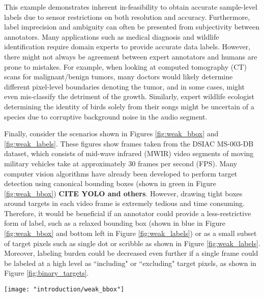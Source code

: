 This example demonstrates inherent in-feasibility to obtain accurate sample-level labels due to sensor restrictions on both resolution and accuracy.  Furthermore, label imprecision and ambiguity can often be presented from subjectivity between annotators. Many applications such as medical diagnosis and wildlife identification require domain experts to provide accurate data labels.  However, there might not always be agreement between expert annotators and humans are prone to mistakes.  For example, when looking at computed tomography (CT) scans for malignant/benign tumors, many doctors would likely determine different pixel-level boundaries denoting the tumor, and in some cases, might even mis-classify the detriment of the growth.  Similarly, expert wildlife  ecologist determining the identity of birds solely from their songs might be uncertain of a species due to corruptive background noise in the audio segment.

Finally, consider the scenarios shown in Figures \ref{fig:weak_bbox} and \ref{fig:weak_labels}.  These figures show frames taken from the DSIAC MS-003-DB dataset, which consists of mid-wave infrared (MWIR) video segments of moving military vehicles take at approximately 30 frames per second (FPS).  Many computer vision algorithms have already been developed to perform target detection using canonical bounding boxes (shown in green in Figure \ref{fig:weak_bbox}) \textbf{CITE YOLO and others}.  However, drawing tight boxes around targets in each video frame is extremely tedious and time consuming.  Therefore, it would be beneficial if an annotator could provide a less-restrictive form of label, such as a relaxed bounding box (shown in blue in Figure \ref{fig:weak_bbox} and bottom left in Figure \ref{fig:weak_labels}) or as a small subset of target pixels such as single dot or scribble as shown in Figure \ref{fig:weak_labels}.  Moreover, labeling burden could be decreased even further if a single frame could be labeled at a high level as ``including" or ``excluding" target pixels, as shown in Figure \ref{fig:binary_targets}. 


\begin{center}
	\begin{figure*}[h]
		\centering
		\texttt{[image: "introduction/weak\_bbox"]}
		\caption{A sample frame from the DSIAC  MS-003-DB MWIR dataset.  Two targets are shown with canonical bounding boxes (green) and relaxed bounding boxes (blue).  Red dots represent the centers of the target objects.}
		\label{fig:weak_bbox}
	\end{figure*}
\end{center}

